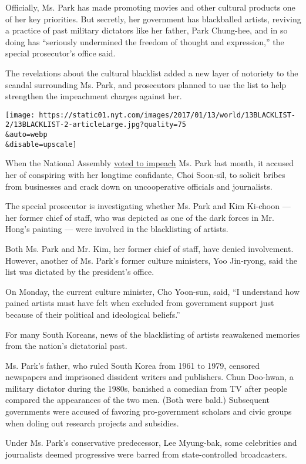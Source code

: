 Officially, Ms. Park has made promoting movies and other cultural
products one of her key priorities. But secretly, her government has
blackballed artists, reviving a practice of past military dictators like
her father, Park Chung-hee, and in so doing has ``seriously undermined
the freedom of thought and expression,'' the special prosecutor's office
said.

The revelations about the cultural blacklist added a new layer of
notoriety to the scandal surrounding Ms. Park, and prosecutors planned
to use the list to help strengthen the impeachment charges against her.

\texttt{[image: https://static01.nyt.com/images/2017/01/13/world/13BLACKLIST-2/13BLACKLIST-2-articleLarge.jpg?quality=75\\\&auto=webp\\\&disable=upscale]}

When the National Assembly
\href{https://www.nytimes.com/2016/12/09/world/asia/south-korea-president-park-geun-hye-impeached.html}{voted
to impeach} Ms. Park last month, it accused her of conspiring with her
longtime confidante, Choi Soon-sil, to solicit bribes from businesses
and crack down on uncooperative officials and journalists.

The special prosecutor is investigating whether Ms. Park and Kim
Ki-choon --- her former chief of staff, who was depicted as one of the
dark forces in Mr. Hong's painting --- were involved in the blacklisting
of artists.

Both Ms. Park and Mr. Kim, her former chief of staff, have denied
involvement. However, another of Ms. Park's former culture ministers,
Yoo Jin-ryong, said the list was dictated by the president's office.

On Monday, the current culture minister, Cho Yoon-sun, said, ``I
understand how pained artists must have felt when excluded from
government support just because of their political and ideological
beliefs.''

For many South Koreans, news of the blacklisting of artists reawakened
memories from the nation's dictatorial past.

Ms. Park's father, who ruled South Korea from 1961 to 1979, censored
newspapers and imprisoned dissident writers and publishers. Chun
Doo-hwan, a military dictator during the 1980s, banished a comedian from
TV after people compared the appearances of the two men. (Both were
bald.) Subsequent governments were accused of favoring pro-government
scholars and civic groups when doling out research projects and
subsidies.

Under Ms. Park's conservative predecessor, Lee Myung-bak, some
celebrities and journalists deemed progressive were barred from
state-controlled broadcasters.

